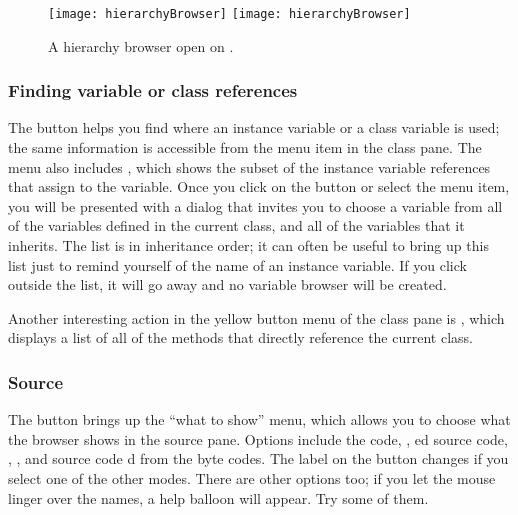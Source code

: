\documentclass[a4paper,10pt,twoside]{book}
\begin{document}
\begin{figure}[btp]
	\begin{center}
	\ifluluelse
		{\texttt{[image: hierarchyBrowser]}}
		{\texttt{[image: hierarchyBrowser]}}
	\end{center}
	\caption{A hierarchy browser open on .}
	\label{fig:hierarchyBrowser}
\end{figure}

\subsubsection{Finding variable or class references}
\label{sec:variables}

The  button helps you find where an instance variable or a class variable is used; the same information is accessible from the  menu item  in the class pane.
The menu also includes , which shows the subset of the instance variable references that assign to the variable.
Once you click on the button or select the menu item, you will be presented with a dialog that invites you to choose a variable from all of the variables defined in the current class, and all of the variables that it inherits.
The list is in inheritance order; it can often be useful to bring up this list just to remind yourself of the name of an instance variable.
If you click outside the list, it will go away and no variable browser will be created.

Another interesting action in the yellow button menu of the class pane is , which displays a list of all of the methods that directly reference the current class.

\subsubsection{Source}
\label{sec:sources}

The  button brings up the ``what to show'' menu, which allows you to choose what the browser shows in the source pane.  Options include the  code, , ed source code, , , and source code d from the byte codes.
The label on the button changes if you select one of the other modes.
There are other options too; if you let the mouse linger over the names, a help balloon will appear.
Try some of them.
\end{document}
